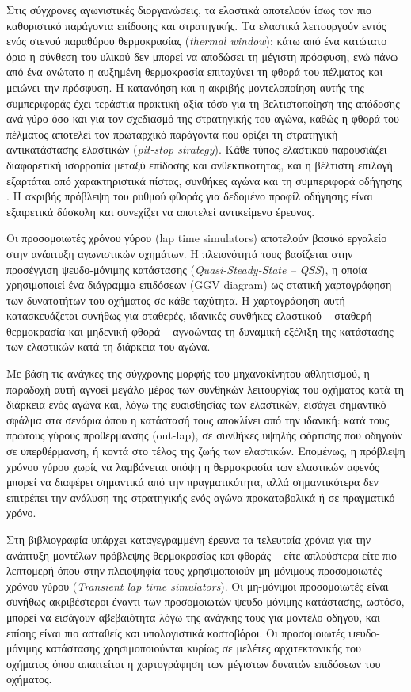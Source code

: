 Στις σύγχρονες αγωνιστικές διοργανώσεις, τα ελαστικά αποτελούν ίσως τον πιο καθοριστικό 
παράγοντα επίδοσης και στρατηγικής. Τα ελαστικά λειτουργούν εντός ενός
στενού παραθύρου θερμοκρασίας (\textit{thermal window}): κάτω από ένα κατώτατο όριο η σύνθεση του
υλικού δεν μπορεί να αποδώσει τη μέγιστη πρόσφυση, ενώ πάνω από ένα ανώτατο η αυξημένη
θερμοκρασία επιταχύνει τη φθορά του πέλματος και μειώνει την πρόσφυση. Η κατανόηση και η ακριβής
μοντελοποίηση αυτής της συμπεριφοράς έχει τεράστια πρακτική αξία τόσο για τη
βελτιστοποίηση της απόδοσης ανά γύρο όσο και για τον σχεδιασμό της στρατηγικής του αγώνα, καθώς η φθορά του πέλματος αποτελεί τον πρωταρχικό παράγοντα που ορίζει τη στρατηγική
αντικατάστασης ελαστικών (\textit{pit-stop strategy}). Κάθε τύπος ελαστικού παρουσιάζει διαφορετική 
ισορροπία μεταξύ επίδοσης και
ανθεκτικότητας, και η βέλτιστη επιλογή εξαρτάται από χαρακτηριστικά πίστας, συνθήκες αγώνα
και τη συμπεριφορά οδήγησης \cite{West2022, Tremlett2016}. Η ακριβής πρόβλεψη του ρυθμού φθοράς
για δεδομένο προφίλ οδήγησης είναι εξαιρετικά δύσκολη και συνεχίζει να αποτελεί
αντικείμενο έρευνας.

Οι προσομοιωτές χρόνου γύρου (lap time simulators) αποτελούν βασικό εργαλείο στην ανάπτυξη
αγωνιστικών οχημάτων. Η πλειονότητά τους βασίζεται στην προσέγγιση ψευδο-μόνιμης κατάστασης
(\textit{Quasi-Steady-State -- QSS}), η οποία χρησιμοποιεί ένα διάγραμμα επιδόσεων (GGV
diagram) ως στατική χαρτογράφηση των δυνατοτήτων του οχήματος σε κάθε ταχύτητα. Η
χαρτογράφηση αυτή κατασκευάζεται συνήθως για σταθερές, ιδανικές συνθήκες ελαστικού --
σταθερή θερμοκρασία και μηδενική φθορά -- αγνοώντας τη δυναμική εξέλιξη της κατάστασης των
ελαστικών κατά τη διάρκεια του αγώνα.

Με βάση τις ανάγκες της σύγχρονης μορφής του μηχανοκίνητου αθλητισμού, η παραδοχή αυτή
αγνοεί μεγάλο μέρος των συνθηκών λειτουργίας του οχήματος κατά τη διάρκεια ενός αγώνα και, λόγω της ευαισθησίας των ελαστικών,
εισάγει σημαντικό σφάλμα στα σενάρια όπου η κατάστασή τους
αποκλίνει από την ιδανική: κατά τους πρώτους γύρους προθέρμανσης (out-lap), σε συνθήκες υψηλής φόρτισης
που οδηγούν σε υπερθέρμανση, ή κοντά στο τέλος της ζωής των ελαστικών. Επομένως, η πρόβλεψη χρόνου γύρου χωρίς να λαμβάνεται υπόψη η θερμοκρασία των ελαστικών
αφενός μπορεί να διαφέρει σημαντικά από την πραγματικότητα, αλλά σημαντικότερα δεν επιτρέπει την 
ανάλυση της στρατηγικής ενός αγώνα προκαταβολικά ή σε πραγματικό χρόνο.

Στη βιβλιογραφία υπάρχει καταγεγραμμένη έρευνα τα τελευταία χρόνια για την ανάπτυξη μοντέλων πρόβλεψης 
θερμοκρασίας και φθοράς -- είτε απλούστερα είτε πιο λεπτομερή όπου στην πλειοψηφία τους
χρησιμοποιούν μη-μόνιμους προσομοιωτές χρόνου γύρου (\textit{Transient lap time simulators}). Οι μη-μόνιμοι προσομοιωτές είναι συνήθως ακριβέστεροι έναντι των προσομοιωτών ψευδο-μόνιμης κατάστασης, ωστόσο, μπορεί να εισάγουν αβεβαιότητα
λόγω της ανάγκης τους για μοντέλο οδηγού, και επίσης είναι πιο ασταθείς και υπολογιστικά κοστοβόροι. Οι προσομοιωτές ψευδο-μόνιμης κατάστασης χρησιμοποιούνται
κυρίως σε μελέτες αρχιτεκτονικής του οχήματος όπου απαιτείται η χαρτογράφηση των μέγιστων δυνατών επιδόσεων του οχήματος.

